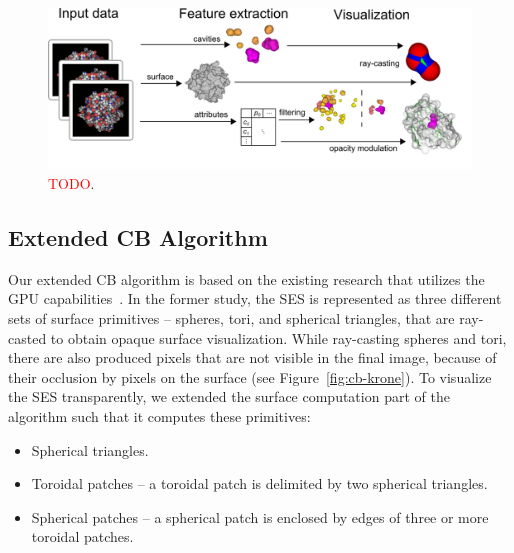 \begin{figure}[htb]
  \centering
  \includegraphics[width=\textwidth]{image/overview.png}
  \caption{\textcolor{red}{TODO}.}
	\label{fig:overview}
\end{figure}

\subsection{Extended CB Algorithm}
\label{sec:ecb}
Our extended CB algorithm is based on the existing research that utilizes the GPU capabilities~\cite{krone2011parallel}.
In the former study, the SES is represented as three different sets of surface primitives -- spheres, tori, and spherical triangles, that are ray-casted to obtain opaque surface visualization. 
While ray-casting spheres and tori, there are also produced pixels that are not visible in the final image, because of their occlusion by pixels on the surface (see Figure~\ref{fig:cb-krone}).
To visualize the SES transparently, we extended the surface computation part of the algorithm such that it computes these primitives:
\begin{itemize}
	\item Spherical triangles.
  \item Toroidal patches -- a toroidal patch is delimited by two spherical triangles.
	\item Spherical patches -- a spherical patch is enclosed by edges of three or more toroidal patches.
\end{itemize}


